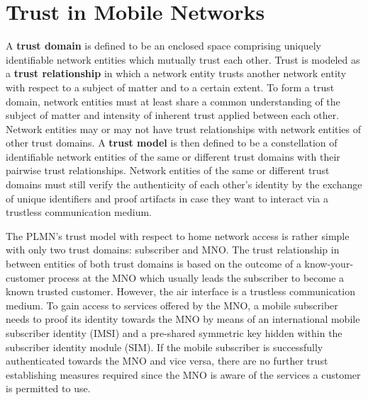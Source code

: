 \documentclass[conference]{IEEEtran}
\begin{document}
     
\section{Trust in Mobile Networks}
\label{domains}
A {\bf{trust domain}} is defined to be an enclosed space comprising uniquely identifiable network entities which mutually trust each other. Trust is modeled as a {\bf{trust relationship}} in which a network entity trusts another network entity with respect to a subject of matter and to a certain extent. To form a trust domain, network entities must at least share a common understanding of the subject of matter and intensity of inherent trust applied between each other. Network entities may or may not have trust relationships with network entities of other trust domains. A {\bf{trust model}} is then defined to be a constellation of identifiable network entities of the same or different trust domains with their pairwise trust relationships. Network entities of the same or different trust domains must still verify the authenticity of each other's identity by the exchange of unique identifiers and proof artifacts in case they want to interact via a trustless communication medium.         

The PLMN's trust model with respect to home network access is rather simple with only two trust domains: subscriber and MNO. The trust relationship in between entities of both trust domains is based on the outcome of a know-your-customer process at the MNO which usually leads the subscriber to become a known trusted customer. However, the air interface is a trustless communication medium. To gain access to services offered by the MNO, a mobile subscriber needs to proof its identity towards the MNO by means of an international mobile subscriber identity (IMSI) and a pre-shared symmetric key hidden within the subscriber identity module (SIM). If the mobile subscriber is successfully authenticated towards the MNO and vice versa, there are no further trust establishing measures required since the MNO is aware of the services a customer is permitted to use.    
\end{document}

